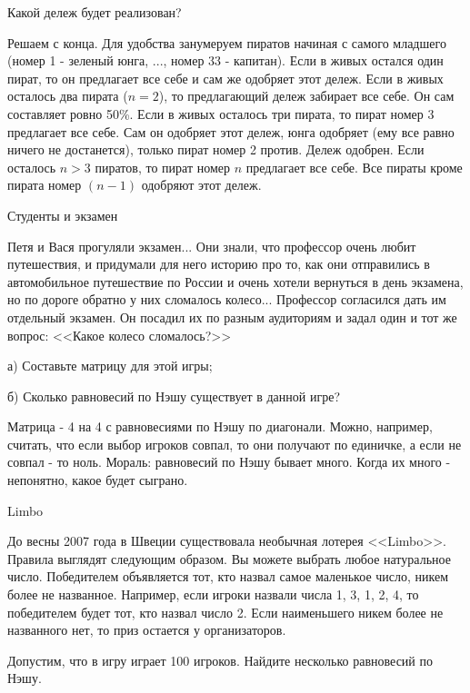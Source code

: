 \documentclass[pdftex,12pt,a4paper]{article}
\begin{document}
Какой дележ будет реализован?

\vspace{10pt}
Решаем с конца. Для удобства занумеруем пиратов начиная с самого младшего (номер 1 - зеленый юнга, ..., номер $33$ - капитан). Если в живых остался один пират, то он предлагает все себе и сам же одобряет этот дележ. Если в живых осталось два пирата ($n=2$), то предлагающий дележ забирает все себе. Он сам составляет ровно 50\%. Если в живых осталось три пирата, то пират номер 3 предлагает все себе. Сам он одобряет этот дележ, юнга одобряет (ему все равно ничего не достанется), только пират номер 2 против. Дележ одобрен. Если осталось $n>3$ пиратов, то пират номер $n$ предлагает все себе. Все пираты кроме пирата номер $(n-1)$ одобряют этот дележ.


\vspace{10pt}
Студенты и экзамен \par
Петя и Вася прогуляли экзамен... Они знали, что профессор очень любит путешествия, и придумали для него историю про то, как они отправились в автомобильное путешествие по России и очень хотели вернуться в день экзамена, но по дороге обратно у них сломалось колесо... Профессор согласился дать им отдельный экзамен. Он посадил их по разным аудиториям и задал один и тот же вопрос: <<Какое колесо сломалось?>>\par
а)	Составьте матрицу для этой игры;\par
б)	Сколько равновесий по Нэшу существует в данной игре?\par

\vspace{10pt}
Матрица - 4 на 4 с равновесиями по Нэшу по диагонали. Можно, например, считать, что если выбор игроков совпал, то они получают по единичке, а если не совпал - то ноль. Мораль: равновесий по Нэшу бывает много. Когда их много - непонятно, какое будет сыграно.

\vspace{10pt}
Limbo

До весны 2007 года в Швеции существовала необычная лотерея <<Limbo>>. Правила выглядят следующим образом. Вы можете выбрать любое натуральное число. Победителем объявляется тот, кто назвал самое маленькое число, никем более не названное. Например, если игроки назвали числа 1, 3, 1, 2, 4, то победителем будет тот, кто назвал число 2. Если наименьшего никем более не названного нет, то приз остается у организаторов. \par
Допустим, что в игру играет 100 игроков. Найдите несколько равновесий по Нэшу. 
\end{document}
